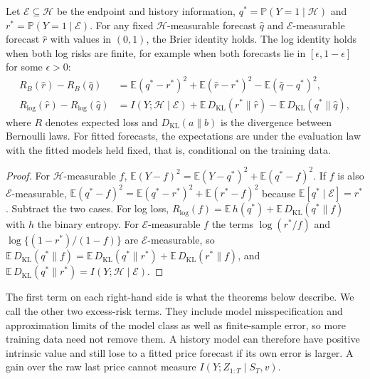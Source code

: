 \documentclass[runningheads]{llncs}
\newcommand{\E}{\mathbb E}
\newcommand{\Prob}{\mathbb P}
\newcommand{\KL}{D_{\mathrm{KL}}}
\begin{document}
\begin{proposition}
\label{prop:decomposition}
Let $\mathcal E\subseteq\mathcal H$ be the endpoint and history information, $q^*=\Prob(Y=1\mid\mathcal H)$ and $r^*=\Prob(Y=1\mid\mathcal E)$. For any fixed $\mathcal H$-measurable forecast $\widehat q$ and $\mathcal E$-measurable forecast $\widehat r$ with values in $(0,1)$, the Brier identity holds. The log identity holds when both log risks are finite, for example when both forecasts lie in $[\epsilon,1-\epsilon]$ for some $\epsilon>0$:
\begin{align*}
 R_B(\widehat r)-R_B(\widehat q)&=\E(q^*-r^*)^2+\E(\widehat r-r^*)^2-\E(\widehat q-q^*)^2,\\
 R_{\log}(\widehat r)-R_{\log}(\widehat q)&=I(Y;\mathcal H\mid\mathcal E)+\E\,\KL(r^*\|\widehat r)-\E\,\KL(q^*\|\widehat q),
\end{align*}
where $R$ denotes expected loss and $\KL(a\|b)$ is the divergence between Bernoulli laws. For fitted forecasts, the expectations are under the evaluation law with the fitted models held fixed, that is, conditional on the training data.
\end{proposition}
\begin{proof}
For $\mathcal H$-measurable $f$, $\E(Y-f)^2=\E(Y-q^*)^2+\E(q^*-f)^2$. If $f$ is also $\mathcal E$-measurable, $\E(q^*-f)^2=\E(q^*-r^*)^2+\E(r^*-f)^2$ because $\E[q^*\mid\mathcal E]=r^*$. Subtract the two cases. For log loss, $R_{\log}(f)=\E\,h(q^*)+\E\,\KL(q^*\|f)$ with $h$ the binary entropy. For $\mathcal E$-measurable $f$ the terms $\log(r^*/f)$ and $\log\{(1-r^*)/(1-f)\}$ are $\mathcal E$-measurable, so $\E\,\KL(q^*\|f)=\E\,\KL(q^*\|r^*)+\E\,\KL(r^*\|f)$, and $\E\,\KL(q^*\|r^*)=I(Y;\mathcal H\mid\mathcal E)$.
\end{proof}
The first term on each right-hand side is what the theorems below describe. We call the other two excess-risk terms. They include model misspecification and approximation limits of the model class as well as finite-sample error, so more training data need not remove them. A history model can therefore have positive intrinsic value and still lose to a fitted price forecast if its own error is larger. A gain over the raw last price cannot measure $I(Y;Z_{1:T}\mid S_T,v)$.
\end{document}

